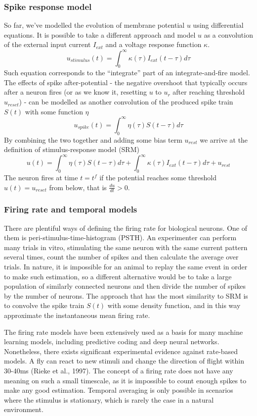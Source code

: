 \documentclass[12pt]{article}
\begin{document}
\subsubsection{Spike response model}

So far, we've modelled the evolution of membrane potential $u$ using differential equations. It is possible to take a different approach and model $u$ as a convolution of the external input current $I_{ext}$ and a voltage response function $\kappa$.
\[
u_{stimulus}(t) = \int_{0}^{\infty} \kappa(\tau) I_{ext} (t-\tau) d\tau
\]
Such equation corresponds to the ``integrate'' part of an integrate-and-fire model. The effects of spike after-potential - the negative overshoot that typically occurs after a neuron fires (or as we know it, resetting $u$ to $u_r$ after reaching threshold $u_{reset}$) - can be modelled as another convolution of the produced spike train $S(t)$ with some function $\eta$
\[
u_{spike}(t) = \int_{0}^{\infty} \eta(\tau) S (t-\tau) d\tau
\]
By combining the two together and adding some bias term $u_{rest}$ we arrive at the definition of stimulus-response model (SRM)
\[
u(t) = \int_{0}^{\infty} \eta(\tau) S (t-\tau) d\tau + \int_{0}^{\infty} \kappa(\tau) I_{ext} (t-\tau) d\tau + u_{rest}
\]
The neuron fires  at time $t=t^f$ if the potential reaches some threshold $u(t)=u_{reset}$ from below, that is $\frac{du}{dt}>0$.



\subsubsection{Firing rate and temporal models}

There are plentiful ways of defining the firing rate for biological neurons. 
One of them is peri-stimulus-time-histogram (PSTH). An experimenter can perform many trials in vitro, stimulating the same neuron with the same current pattern several times, count the number of spikes and then calculate the average over trials. In nature, it is impossible for an animal to replay the same event in order to make such estimation, so a different alternative would be to take a large population of similarly connected neurons and then divide the number of spikes by the number of neurons. The approach that has the most similarity to SRM is to convolve the spike train $S(t)$ with some density function, and in this way approximate the instantaneous mean firing rate. 

The firing rate models have been extensively used as a basis for many machine learning models, including predictive coding and deep neural networks. Nonetheless, there exists significant experimental evidence against rate-based models. A fly can react to new stimuli and change the direction of flight within 30-40ms (Rieke et al., 1997). The concept of a firing rate does not have any meaning on such a small timescale, as it is impossible to count enough spikes to make any good estimation. Temporal averaging is only possible in scenarios where the stimulus is stationary, which is rarely the case in a natural environment.
\end{document}
